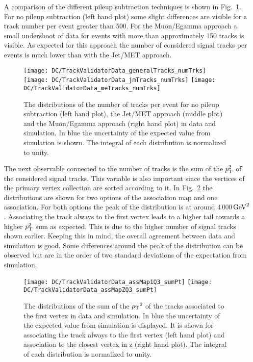 A comparison of the different pileup subtraction techniques is shown in Fig.~\ref{plot:DCTVTDPUS}. For no pileup subtraction (left hand plot) some slight differences are visible for a track number per event greater than 500. For the Muon/Egamma approach a small undershoot of data for events with more than approximately 150 tracks is visible. As expected for this approach the number of considered signal tracks per events is much lower than with the Jet/MET approach.

\begin{figure}[Ht]
  \centering
  \texttt{[image: DC/TrackValidatorData\_generalTracks\_numTrks]}
  \texttt{[image: DC/TrackValidatorData\_jmTracks\_numTrks]}
  \texttt{[image: DC/TrackValidatorData\_meTracks\_numTrks]}
  \caption[Track number in data and simulation of the different pileup subtraction techniques]{The distributions of the number of tracks per event for no pileup subtraction (left hand plot), the Jet/MET approach (middle plot) and the Muon/Egamma approach (right hand plot) in data and simulation. In blue the uncertainty of the expected value from simulation is shown. The integral of each distribution is normalized to unity. \label{plot:DCTVTDPUS}}
\end{figure}

The next observable connected to the number of tracks is the sum of the $p_{\mathrm{T}}^{2}$ of the considered signal tracks. This variable is also important since the vertices of the primary vertex collection are sorted according to it. In Fig.~\ref{plot:DCTVSumPt} the distributions are shown for two options of the association map and one association. For both options the peak of the distribution is at around 4\,000$\,\text{Ge\hspace{-.08em}V}^{2}$. Associating the track always to the first vertex leads to a higher tail towards a higher $p_{\mathrm{T}}^{2}$ sum as expected. This is due to the higher number of signal tracks shown earlier. Keeping this in mind, the overall agreement between data and simulation is good. Some differences around the peak of the distribution can be observed but are in the order of two standard deviations of the expectation from simulation.

\begin{figure}[Ht]
  \centering
  \texttt{[image: DC/TrackValidatorData\_assMap1Q3\_sumPt]}
  \texttt{[image: DC/TrackValidatorData\_assMapZQ3\_sumPt]}
  \caption[Distribution of the first vertex $\pt{}^{2}$ in data and simulation of two options of the association map]{The distributions of the sum of the $\pt{}^{2}$ of the tracks associated to the first vertex in data and simulation. In blue the uncertainty of the expected value from simulation is displayed. It is shown for associating the track always to the first vertex (left hand plot) and association to the closest vertex in z (right hand plot). The integral of each distribution is normalized to unity. \label{plot:DCTVSumPt}}
\end{figure}

